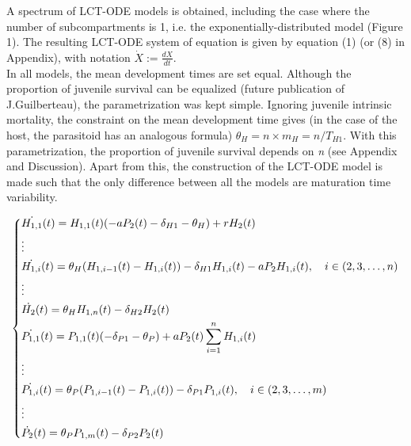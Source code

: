 \documentclass[12pt,a4paper,onecolumn]{article}
\begin{document}
\tabto{1 cm} A spectrum of LCT-ODE models is obtained, including the case where the number of subcompartments is 1, i.e. the exponentially-distributed model (Figure 1). The resulting LCT-ODE system of equation is given by equation (1) (or (8) in Appendix), with notation $\dot{X} := \frac{dX}{dt}$. \\

\tabto{1 cm} In all models, the mean development times are set equal. Although the proportion of juvenile survival can be equalized (future publication of J.Guilberteau), the parametrization was kept simple. Ignoring juvenile intrinsic mortality,  the constraint on the mean development time gives (in the case of the host, the parasitoid has an analogous formula) $\theta_H = n \times m_H = n/T_{H1}$. With this parametrization, the proportion of juvenile survival depends on \textit{n} (see Appendix and Discussion). Apart from this, the construction of the LCT-ODE model is made such that the only difference between all the models are maturation time variability. 

\begin{equation}
\begin{dcases}
\dot{H_{1,1}}(t) = H_{1,1}(t)(-a P_2(t) - \delta_{H1} - \theta_H) + r H_2(t) \\
\vdots \\
\dot{H_{1,i}}(t) = \theta_H(H_{1,i-1}(t) - H_{1,i}(t)) - \delta_{H1} H_{1,i}(t) - aP_2H_{1,i}(t), \quad i \in (2, 3, \dots, n) \\
\vdots \\
\dot{H_{2}}(t) = \theta_H H_{1,n}(t) - \delta_{H2} H_{2}(t) \\
\dot{P_{1,1}}(t) = P_{1,1}(t)(- \delta_{P1} - \theta_P) + a P_2(t) \sum_{i=1}^{n} H_{1,i}(t) \\
\vdots \\
\dot{P_{1,i}}(t) = \theta_P(P_{1,i-1}(t) - P_{1,i}(t)) - \delta_{P1} P_{1,i}(t), \quad i \in (2, 3, \dots, m) \\
\vdots \\
\dot{P_{2}}(t) = \theta_P P_{1,m}(t) - \delta_{P2} P_{2}(t) \\
\end{dcases}
\end{equation}
\end{document}
